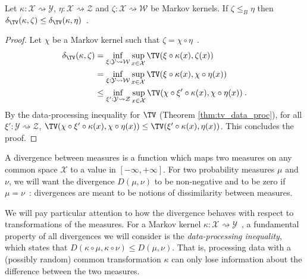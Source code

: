 \begin{lemma}
  \label{lem:deficiency_mono_right}
  Let $\kappa: \mathcal X \rightsquigarrow \mathcal Y$, $\eta : \mathcal X \rightsquigarrow \mathcal Z$ and $\zeta : \mathcal X \rightsquigarrow \mathcal W$ be Markov kernels.
  If $\zeta \le_B \eta$ then $\delta_{\TV}(\kappa, \zeta) \le \delta_{\TV}(\kappa, \eta)$~.
\end{lemma}

\begin{proof}%
{}
Let $\chi$ be a Markov kernel such that $\zeta = \chi \circ \eta$~.
\begin{align*}
\delta_{\TV}(\kappa, \zeta)
&= \inf_{\xi : \mathcal Y \rightsquigarrow \mathcal W} \sup_{x \in \mathcal X} \TV(\xi \circ \kappa (x), \zeta(x))
\\
&= \inf_{\xi : \mathcal Y \rightsquigarrow \mathcal W} \sup_{x \in \mathcal X} \TV(\xi \circ \kappa (x), \chi \circ \eta(x))
\\
&\le \inf_{\xi' : \mathcal Y \rightsquigarrow \mathcal Z} \sup_{x \in \mathcal X} \TV(\chi \circ \xi' \circ \kappa (x), \chi \circ \eta(x))
\: .
\end{align*}
By the data-processing inequality for $\TV$ (Theorem \ref{thm:tv_data_proc}), for all $\xi' : \mathcal Y \rightsquigarrow \mathcal Z$, $\TV(\chi \circ \xi' \circ \kappa (x), \chi \circ \eta(x)) \le \TV(\xi' \circ \kappa (x), \eta(x))$.
This concludes the proof.
\end{proof}


A divergence between measures is a function which maps two measures on any common space $\mathcal X$ to a value in $[-\infty, +\infty]$.
For two probability measures $\mu$ and $\nu$, we will want the divergence $D(\mu, \nu)$ to be non-negative and to be zero if $\mu = \nu$~: divergences are meant to be notions of dissimilarity between measures.

We will pay particular attention to how the divergence behaves with respect to transformations of the measures.
For a Markov kernel $\kappa : \mathcal X \rightsquigarrow \mathcal Y$~, a fundamental property of all divergences we will consider is the \emph{data-processing inequality}, which states that $D(\kappa \circ \mu, \kappa \circ \nu) \le D(\mu, \nu)$.
That is, processing data with a (possibly random) common transformation $\kappa$ can only lose information about the difference between the two measures.

